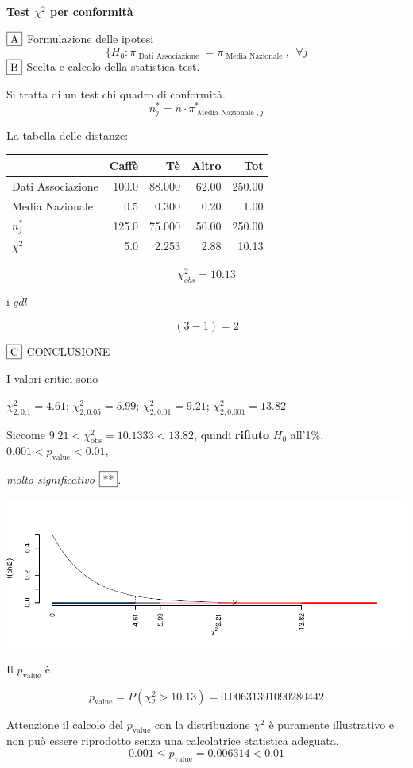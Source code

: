 \documentclass[
  11pt,
]{book}
\theoremstyle{mytheoremstyle}
\theoremstyle{mydefstyle}
\newenvironment{sol}
  {
  \begin{tcolorbox}[enhanced,breakable,arc=0.1mm,boxrule=1pt,colback=white,colframe=iblue,
  title=\bf \fontfamily{lmss}\selectfont \hspace{.5 cm} Soluzione,drop fuzzy shadow]

}{
\end{tcolorbox}
  }
\begin{document}
\begin{sol}
\textbf{Test \(\chi^2\) per conformità}

\(\fbox{A}\) Formulazione delle ipotesi
\[
\{H_0:\pi_\text{ Dati Associazione }= \pi_\text{ Media Nazionale },~~\forall j
\]
\(\fbox{B}\) Scelta e calcolo della statistica test.

Si tratta di un test chi quadro di conformità.
\[
n^*_j = n\cdot \pi^*_{\text{ Media Nazionale },j} 
\]

La tabella delle distanze:

\begin{table}[H]
\centering
\begin{tabular}{lrrrr}
\toprule
  & Caffè & Tè & Altro & Tot\\
\midrule
Dati Associazione & 100.0 & 88.000 & 62.00 & 250.00\\
Media Nazionale & 0.5 & 0.300 & 0.20 & 1.00\\
$n_j^*$ & 125.0 & 75.000 & 50.00 & 250.00\\
$\chi^2$ & 5.0 & 2.253 & 2.88 & 10.13\\
\bottomrule
\end{tabular}
\end{table}

\[
    \chi^2_{obs}= 10.13 
  \]

i \(gdl\)

\[
    ( 3 -1)= 2 
  \]

\(\fbox{C}\) CONCLUSIONE

I valori critici sono

\(\chi^2_{2;0.1}=4.61\); \(\chi^2_{2;0.05}=5.99\); \(\chi^2_{2;0.01}=9.21\); \(\chi^2_{2;0.001}=13.82\)

Siccome \(9.21<\chi^2_\text{obs}=10.1333<13.82\), quindi \textbf{rifiuto} \(H_0\) all'1\%, \(0.001<p_\text{value}<0.01\),

\emph{molto significativo} \(\fbox{**}\).

\begin{center}\includegraphics{Esami_passati_con_soluzioni_files/figure-latex/05a-chi2-10-1} \end{center}

Il \(p_{\text{value}}\) è

\[ p_{\text{value}} = P(\chi^2_{2}>10.13)=0.00631391090280442 \]

Attenzione il calcolo del \(p_\text{value}\) con la distribuzione \(\chi^2\) è puramente illustrativo e non può essere riprodotto senza una calcolatrice statistica adeguata.\[
 0.001 \leq p_\text{value}= 0.006314 < 0.01 
\]

\end{sol}
\end{document}

